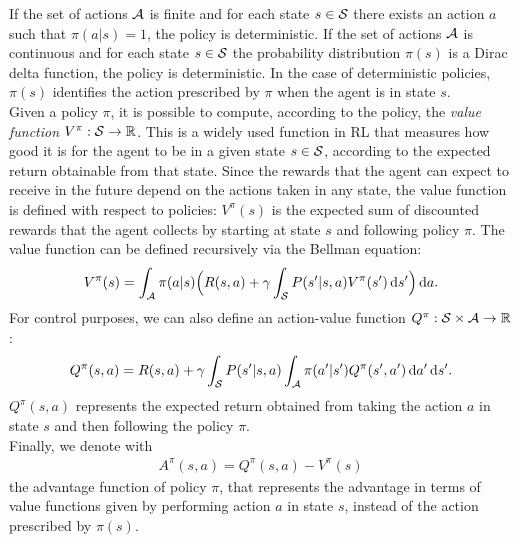 If the set of actions $\mathcal{A}$ is finite and for each state $s \in \mathcal{S}$ there exists an action $a$ such that $\pi(a|s) = 1$, the policy is deterministic. If the set of actions $\mathcal{A}$ is continuous and for each state $s \in \mathcal{S}$ the probability distribution $\pi(s)$ is a Dirac delta function, the policy is deterministic. In the case of deterministic policies, $\pi(s)$ identifies the action prescribed by $\pi$ when the agent is in state $s$.\\
\newline
Given a policy $\pi$, it is possible to compute, according to the policy, the \emph{value function} $V^{\pi}: \mathcal{S} \rightarrow \mathbb{R}$. This is a widely used function in \ac{RL} that measures how good it is for the agent to be in a given state $s \in \mathcal{S}$, according to the expected return obtainable from that state. Since the rewards that the agent can expect to receive in the future depend on the actions taken in any state, the value function is defined with respect to policies: $V^{\pi}(s)$ is the expected sum of discounted rewards that the agent collects by starting at state $s$ and following policy $\pi$. The value function can be defined recursively via the Bellman equation: 
\begin{align} V^{\pi}(s) = \int_{\mathcal{A}} \pi(a|s) \Big(R(s,a) + \gamma \int_{\mathcal{S}}P(s'|s,a)V^{\pi}(s')\,\mathrm{d} s' \Big) \,\mathrm{d} a. \label{eq:v}\end{align}
For control purposes, we can also define an action-value function $Q^{\pi}: \mathcal{S} \times \mathcal{A} \rightarrow \mathbb{R}$: \begin{align} Q^{\pi}(s,a) = R(s,a) + \gamma \int_{\mathcal{S}} P(s'|s,a) \int_{\mathcal{A}} \pi(a'|s') Q^{\pi}(s',a') \,\mathrm{d} a' \,\mathrm{d} s'.\end{align}
$Q^{\pi}(s,a)$ represents the expected return obtained from taking the action $a$ in state $s$ and then following the policy $\pi$. \\
\newline
Finally, we denote with
\begin{align} A^{\pi}(s,a) = Q^{\pi}(s,a) - V^{\pi}(s) \end{align}
the advantage function of policy $\pi$, that represents the advantage in terms of value functions given by performing action $a$ in state $s$, instead of the action prescribed by $\pi(s)$.

